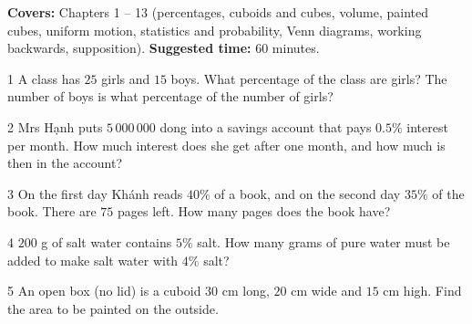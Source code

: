 \begin{knowbox}
\textbf{Covers:} Chapters 1 -- 13 (percentages, cuboids and cubes, volume, painted cubes, uniform motion, statistics and probability, Venn diagrams, working backwards, supposition). \quad \textbf{Suggested time:} $60$ minutes.
\end{knowbox}
\gap
\begin{probbox}{1}{\relax}
A class has $25$ girls and $15$ boys.  What percentage of the class are girls?  The number of boys is what percentage of the number of girls?
\end{probbox}
\gap
\begin{probbox}{2}{\relax}
Mrs Hạnh puts $5\,000\,000$ dong into a savings account that pays $0.5\%$ interest per month. How much interest does she get after one month, and how much is then in the account?
\end{probbox}
\gap
\begin{probbox}{3}{\relax}
On the first day Khánh reads $40\%$ of a book, and on the second day $35\%$ of the book. There are $75$ pages left. How many pages does the book have?
\end{probbox}
\gap
\begin{probbox}{4}{}
$200$ g of salt water contains $5\%$ salt. How many grams of pure water must be added to make salt water with $4\%$ salt?
\end{probbox}
\gap
\begin{probbox}{5}{\relax}
An open box (no lid) is a cuboid $30$ cm long, $20$ cm wide and $15$ cm high. Find the area to be painted on the outside.
\end{probbox}
